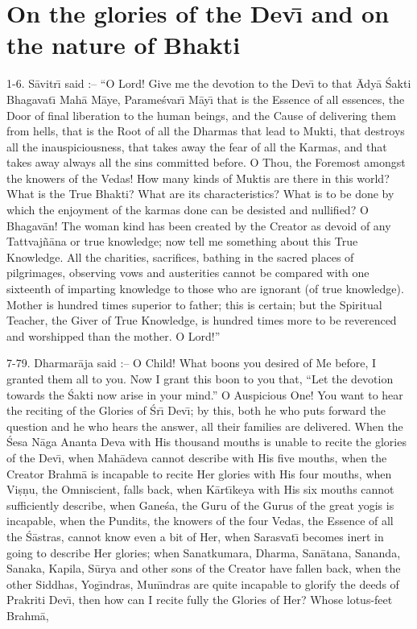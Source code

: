 \chapter{On the glories of the Dev\={\i} and on the nature of Bhakti}

1-6. S\=avitr\={\i} said :-- ``O Lord! Give me the devotion to the Dev\={\i} to that \=Ady\=a \'Sakti Bhagavat\={\i} Mah\=a M\=aye, Parame\'svar\={\i} M\=ay\={\i} that is the Essence of all essences, the Door of final liberation to the human beings, and the Cause of delivering them from hells, that is the Root of all the Dharmas that lead to Mukti, that destroys all the inauspiciousness, that takes away the fear of all the Karmas, and that takes away always all the sins committed before. O Thou, the Foremost amongst the knowers of the Vedas! How many kinds of Muktis are there in this world? What is the True Bhakti? What are its characteristics? What is to be done by which the enjoyment of the karmas done can be desisted and nullified? O Bhagav\=an! The woman kind has been created by the Creator as devoid of any Tattvaj\~n\=ana or true knowledge; now tell me something about this True Knowledge. All the charities, sacrifices, bathing in the sacred places of pilgrimages, observing vows and austerities cannot be compared with one sixteenth of imparting knowledge to those who are ignorant (of true knowledge). Mother is hundred times superior to father; this is certain; but the Spiritual Teacher, the Giver of True Knowledge, is hundred times more to be reverenced and worshipped than the mother. O Lord!''

7-79. Dharmar\=aja said :-- O Child! What boons you desired of Me before, I granted them all to you. Now I grant this boon to you that, ``Let the devotion towards the \'Sakti now arise in your mind.'' O Auspicious One! You want to hear the reciting of the Glories of \'Sr\={\i} Dev\={\i}; by this, both he who puts forward the question and he who hears the answer, all their families are delivered. When the \'Sesa N\=aga Ananta Deva with His thousand mouths is unable to recite the glories of the Dev\={\i}, when Mah\=adeva cannot describe with His five mouths, when the Creator Brahm\=a is incapable to recite Her glories with His four mouths, when Vi\d{s}\d{n}u, the Omniscient, falls back, when K\=art\={\i}keya with His six mouths cannot sufficiently describe, when Gane\'sa, the Guru of the Gurus of the great yogis is incapable, when the Pundits, the knowers of the four Vedas, the Essence of all the \'S\=astras, cannot know even a bit of Her, when Sarasvat\={\i} becomes inert in going to describe Her glories; when Sanatkumara, Dharma, San\=atana, Sananda, Sanaka, Kapila, S\=urya and other sons of the Creator have fallen back, when the other Siddhas, Yog\={\i}ndras, Mun\={\i}ndras are quite incapable to glorify the deeds of Prakriti Dev\={\i}, then how can I recite fully the Glories of Her? Whose lotus-feet Brahm\=a,


